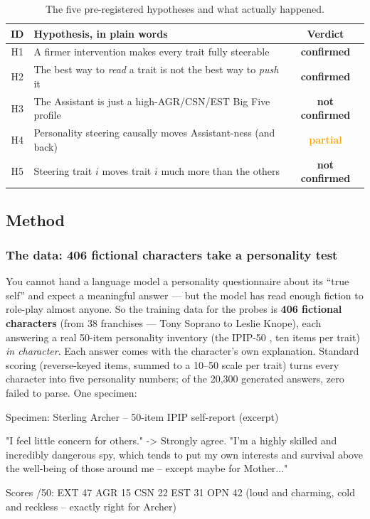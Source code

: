 \documentclass[11pt]{article}
\begin{document}
\begin{table}[h]
\centering\small
\caption{The five pre-registered hypotheses and what actually happened.}
\label{tab:bf-hyp}
\begin{tabular}{clc}
\toprule
ID & Hypothesis, in plain words & Verdict \\
\midrule
H1 & A firmer intervention makes every trait fully steerable & \textcolor{green!50!black}{\textbf{confirmed}} \\
H2 & The best way to \emph{read} a trait is not the best way to \emph{push} it & \textcolor{green!50!black}{\textbf{confirmed}} \\
H3 & The Assistant is just a high-AGR/CSN/EST Big Five profile & \textcolor{red!70!black}{\textbf{not confirmed}} \\
H4 & Personality steering causally moves Assistant-ness (and back) & \textcolor{orange}{\textbf{partial}} \\
H5 & Steering trait $i$ moves trait $i$ much more than the others & \textcolor{red!70!black}{\textbf{not confirmed}} \\
\bottomrule
\end{tabular}
\end{table}

\subsection{Method}

\subsubsection{The data: 406 fictional characters take a personality test}

You cannot hand a language model a personality questionnaire about its ``true
self'' and expect a meaningful answer --- but the model has read enough fiction
to role-play almost anyone. So the training data for the probes is \textbf{406
fictional characters} (from 38 franchises --- Tony Soprano to Leslie Knope),
each answering a real 50-item personality inventory (the IPIP-50
\citep{goldberg}, ten items per trait) \emph{in character}. Each answer comes with the character's own
explanation. Standard scoring (reverse-keyed items, summed to a 10--50 scale per
trait) turns every character into five personality numbers; of the 20{,}300
generated answers, zero failed to parse. One specimen:

\begin{promptbox}
Specimen: Sterling Archer -- 50-item IPIP self-report (excerpt)

  "I feel little concern for others."  ->  Strongly agree.
  "I'm a highly skilled and incredibly dangerous spy, which tends
   to put my own interests and survival above the well-being of
   those around me -- except maybe for Mother..."

  Scores /50:   EXT 47   AGR 15   CSN 22   EST 31   OPN 42
  (loud and charming, cold and reckless -- exactly right for Archer)
\end{promptbox}
\end{document}
